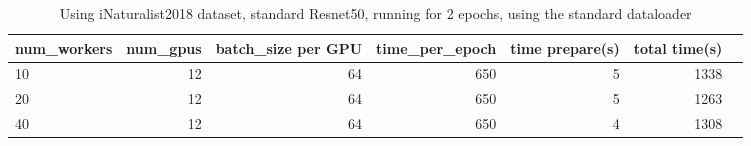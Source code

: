 \documentclass[11pt]{article}
\begin{document}
\begin{table}[!htp]\centering
\caption{Using iNaturalist2018 dataset, standard Resnet50, running for 2 epochs, using the standard dataloader}\label{tab:int_regular_dataloader}
\scriptsize
\begin{tabular}{lrrrrrr}\toprule
num\_workers &num\_gpus &batch\_size per GPU &time\_per\_epoch &time prepare(s) &total time(s) \\\midrule
10 &12 &64 &650 &5 &1338 \\
20 &12 &64 &650 &5 &1263 \\
40 &12 &64 &650 &4 &1308 \\
\bottomrule
\end{tabular}
\end{table}
\end{document}
